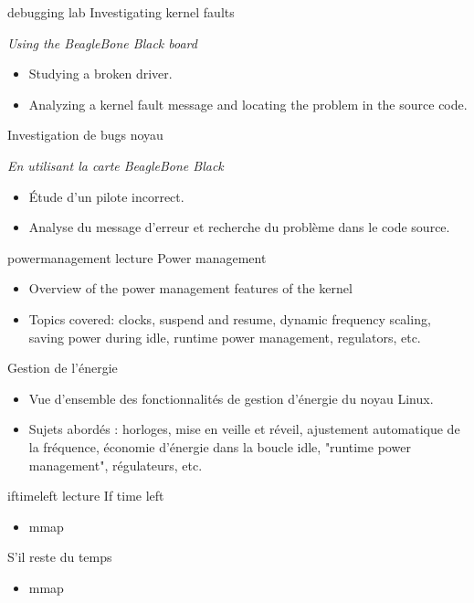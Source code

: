 {debugging}
{lab}
{Investigating kernel faults}
{
  {\em Using the BeagleBone Black board}
  \begin{itemize}
  \item Studying a broken driver.
  \item Analyzing a kernel fault message and locating the problem in the
    source code.
  \end{itemize}
}
{Investigation de bugs noyau}
{
  {\em En utilisant la carte BeagleBone Black}
  \begin{itemize}
  \item Étude d'un pilote incorrect.
  \item Analyse du message d'erreur et recherche du problème dans le code
    source.
  \end{itemize}
}
{powermanagement}
{lecture}
{Power management}
{
  \begin{itemize}
  \item Overview of the power management features of the kernel
  \item Topics covered: clocks, suspend and resume, dynamic frequency
    scaling, saving power during idle, runtime power management,
    regulators, etc.
  \end{itemize}
}
{Gestion de l'énergie}
{
  \begin{itemize}
  \item Vue d'ensemble des fonctionnalités de gestion d'énergie du noyau
    Linux.
  \item Sujets abordés : horloges, mise en veille et réveil, ajustement
    automatique de la fréquence, économie d'énergie dans la boucle idle,
    "runtime power management", régulateurs, etc.
  \end{itemize}
}
{iftimeleft}
{lecture}
{If time left}
{
  \begin{itemize}
  \item mmap
  \end{itemize}
}
{S'il reste du temps}
{
  \begin{itemize}
  \item mmap
  \end{itemize}
}

